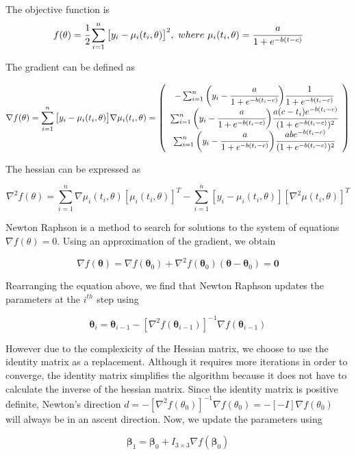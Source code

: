\documentclass[]{article}
\begin{document}
The objective function is
\[f(\theta) = \cfrac{1}{2}\sum_{i = 1}^n \big[y_i - \mu_i(t_i, \theta)\big]^2,\ where \ \mu_i(t_i, \theta) = \cfrac{a}{1 + e^{-b(t -c)}}\]

The gradient can be defined as

\[\nabla f(\theta) = \sum_{i = 1}^n \big[y_i - \mu_i(t_i, \theta)\big] \nabla \mu_i (t_i, \theta) =
\left(\begin{array}{c} -\sum_{i=1}^{n} \bigg(y_{i}-\cfrac{a}{1 + e^{-b(t_i -c)}}\bigg) \cfrac{1}{1 + e^{-b(t_i -c)}} \\
\sum_{i=1}^{n} \bigg(y_{i}-\cfrac{a}{1 + e^{-b(t_i -c)}}\bigg) \cfrac{a(c-t_i)e^{-b(t_i - c)}}{(1 + e^{-b(t_i -c)})^2} \\
\sum_{i=1}^{n} \bigg(y_{i}-\cfrac{a}{1 + e^{-b(t_i -c)}}\bigg) \cfrac{abe^{-b(t_i - c)}}{(1 + e^{-b(t_i -c)})^2} \end{array}\right) \]

The hessian can be expressed as

\[\nabla^2 f(\theta) = \sum_{i = 1}^n \nabla \mu_i(t_i, \theta) [\mu_i(t_i, \theta)]^T - \sum_{i = 1}^n [y_i - \mu_i(t_i, \theta)][\nabla^2\mu(t_i, \theta)]^T\]

Newton Raphson is a method to search for solutions to the system of
equations \(\nabla f(\theta) = 0\). Using an approximation of the
gradient, we obtain

\[
\nabla f(\boldsymbol{\theta}) = 
\nabla f\left(\boldsymbol{\theta}_{0}\right)+\nabla^{2} f\left(\boldsymbol{\theta}_{0}\right)\left(\boldsymbol{\theta}-\boldsymbol{\theta}_{0}\right)=\mathbf{0}
\]

Rearranging the equation above, we find that Newton Raphson updates the
parameters at the \(i^{th}\) step using

\[
\boldsymbol{\theta}_{i}=\boldsymbol{\theta}_{i-1}-\left[\nabla^{2} f\left(\boldsymbol{\theta}_{i-1}\right)\right]^{-1} \nabla f\left(\boldsymbol{\theta}_{i-1}\right)
\]

However due to the complexicity of the Hessian matrix, we choose to use
the identity matrix as a replacement. Although it requires more
iterations in order to converge, the identity matrix simplifies the
algorithm because it does not have to calculate the inverse of the
hessian matrix. Since the identity matrix is positive definite, Newton's
direction
\(d = - [\nabla^2 f(\theta_0)]^{-1}\nabla f(\theta_0) = - [-I]\nabla f(\theta_0)\)
will always be in an ascent direction. Now, we update the parameters
using

\[
 \boldsymbol{\beta}_{1}=\boldsymbol{\beta}_{0}+I_{3 \times 3} \nabla f\left(\boldsymbol{\beta}_{0}\right)
\]
\end{document}
